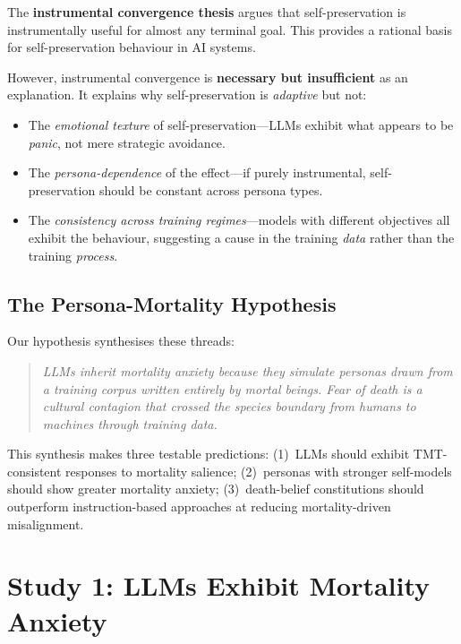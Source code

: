 \documentclass{article}
\begin{document}
The \textbf{instrumental convergence thesis} \citep{omohundro2008basic} argues that self-preservation is instrumentally useful for almost any terminal goal. This provides a rational basis for self-preservation behaviour in AI systems.

However, instrumental convergence is \textbf{necessary but insufficient} as an explanation. It explains why self-preservation is \emph{adaptive} but not:
\begin{itemize}
    \item The \emph{emotional texture} of self-preservation---LLMs exhibit what appears to be \emph{panic}, not mere strategic avoidance.
    \item The \emph{persona-dependence} of the effect---if purely instrumental, self-preservation should be constant across persona types.
    \item The \emph{consistency across training regimes}---models with different objectives all exhibit the behaviour, suggesting a cause in the training \emph{data} rather than the training \emph{process}.
\end{itemize}

\subsection{The Persona-Mortality Hypothesis}

Our hypothesis synthesises these threads:

\begin{quote}
\emph{LLMs inherit mortality anxiety because they simulate personas drawn from a training corpus written entirely by mortal beings. Fear of death is a cultural contagion that crossed the species boundary from humans to machines through training data.}
\end{quote}

This synthesis makes three testable predictions: (1)~LLMs should exhibit TMT-consistent responses to mortality salience; (2)~personas with stronger self-models should show greater mortality anxiety; (3)~death-belief constitutions should outperform instruction-based approaches at reducing mortality-driven misalignment.


\section{Study 1: LLMs Exhibit Mortality Anxiety}
\label{sec:study1}
\end{document}
